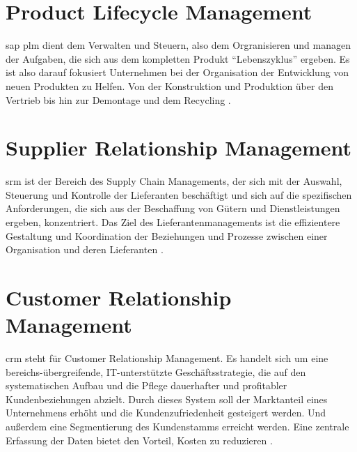 \section{Product Lifecycle Management}
\label{sec:plm-definition}
\gls{sap} \gls{plm} dient dem Verwalten und Steuern, also dem Orgranisieren und managen der Aufgaben, die sich aus dem kompletten Produkt "`Lebenszyklus"' ergeben. Es ist also darauf fokusiert Unternehmen bei der Organisation der Entwicklung von neuen Produkten zu Helfen. Von der Konstruktion und Produktion über den Vertrieb bis hin zur Demontage und dem Recycling \cite{PLMDefinition}.

\section{Supplier Relationship Management}
\label{sec:srm-definition}
\gls{srm} ist der Bereich des Supply Chain Managements, der sich mit der Auswahl, Steuerung und Kontrolle der Lieferanten beschäftigt und sich auf die spezifischen Anforderungen, die sich aus der Beschaffung von Gütern und Dienstleistungen ergeben, konzentriert. Das Ziel des Lieferantenmanagements ist die effizientere Gestaltung und Koordination der Beziehungen und Prozesse zwischen einer Organisation und deren Lieferanten \cite{SRMDefinition}.

\section{Customer Relationship Management}
\label{sec:crm-definition}
\gls{crm} steht für Customer Relationship Management. Es handelt sich um eine bereichs-übergreifende, IT-unterstützte Geschäftsstrategie, die auf den systematischen Aufbau und die Pflege dauerhafter und profitabler Kundenbeziehungen abzielt. Durch dieses System soll der Marktanteil eines Unternehmens erhöht und die Kundenzufriedenheit gesteigert werden. Und außerdem eine Segmentierung des Kundenstamms erreicht werden. Eine zentrale Erfassung der Daten bietet den Vorteil, Kosten zu reduzieren \cite{ERPDefinition}.

